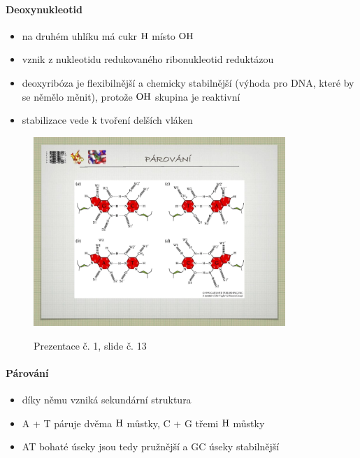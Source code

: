 \documentclass[DIV=8]{scrreprt}
\begin{document}
\paragraph{Deoxynukleotid}
\begin{itemize}[nosep]
    \item na druhém uhlíku má cukr \(\ce{H}\) místo \(\ce{OH}\)
    \item vznik z nukleotidu redukovaného ribonukleotid reduktázou
    \item deoxyribóza je flexibilnější a chemicky stabilnější (výhoda pro DNA, které by se němělo měnit), protože \(\ce{OH}\) skupina je reaktivní
    \item stabilizace vede k tvoření delších vláken
\end{itemize}



\begin{figure}
    \caption{Prezentace č. 1, slide č. 13}
    \includegraphics[width=0.85\textwidth]{slides-1/slide-13.jpg}
    \centering
    \label{slides-1-slide-13}
\end{figure}

\paragraph{Párování}
\begin{itemize}[nosep]
    \item díky němu vzniká sekundární struktura
    \item A + T páruje dvěma \(\ce{H}\) můstky, C + G třemi \(\ce{H}\) můstky
    \item AT bohaté úseky jsou tedy pružnější a GC úseky stabilnější
\end{itemize}
\end{document}
